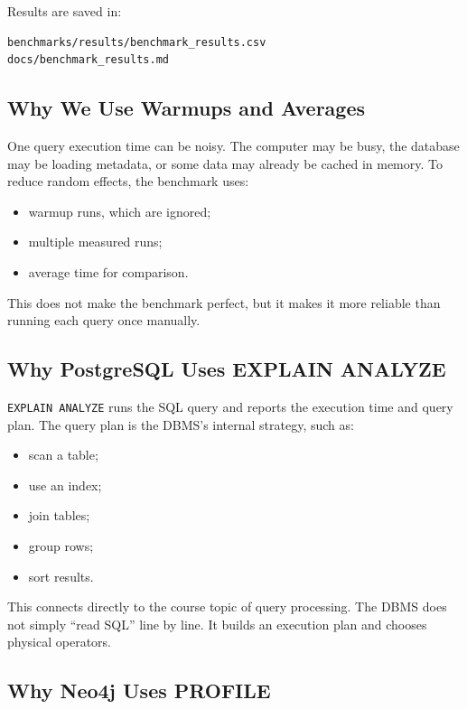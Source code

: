 \documentclass[11pt]{article}
\begin{document}
Results are saved in:

\begin{verbatim}
benchmarks/results/benchmark_results.csv
docs/benchmark_results.md
\end{verbatim}

\subsection{Why We Use Warmups and Averages}

One query execution time can be noisy.
The computer may be busy, the database may be loading metadata, or some data may already be cached in memory.
To reduce random effects, the benchmark uses:

\begin{itemize}
    \item warmup runs, which are ignored;
    \item multiple measured runs;
    \item average time for comparison.
\end{itemize}

This does not make the benchmark perfect, but it makes it more reliable than running each query once manually.

\subsection{Why PostgreSQL Uses EXPLAIN ANALYZE}

\texttt{EXPLAIN ANALYZE} runs the SQL query and reports the execution time and query plan.
The query plan is the DBMS's internal strategy, such as:

\begin{itemize}
    \item scan a table;
    \item use an index;
    \item join tables;
    \item group rows;
    \item sort results.
\end{itemize}

This connects directly to the course topic of query processing.
The DBMS does not simply ``read SQL'' line by line.
It builds an execution plan and chooses physical operators.

\subsection{Why Neo4j Uses PROFILE}
\end{document}
